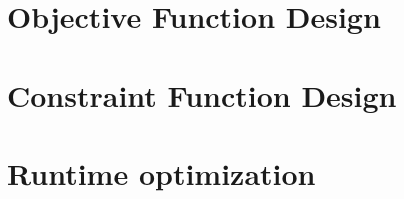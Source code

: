


\section{Objective Function Design}
\label{text:approach/objective}




\section{Constraint Function Design}
\label{text:approach/constraint}




\section{Runtime optimization}
\label{text:approach/runtime}




